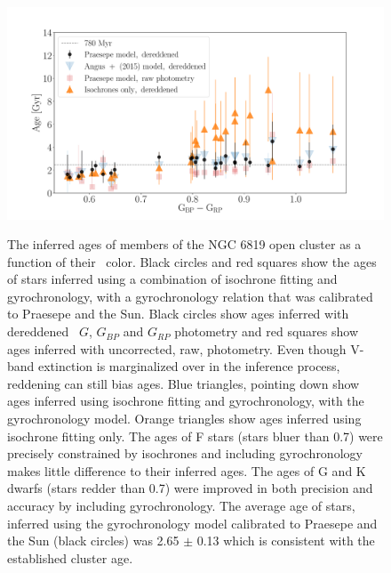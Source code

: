\begin{figure}
  \caption{
    The inferred ages of members of the NGC 6819 open cluster as a function of
    their \gcolor\ color.
    Black circles and red squares show the ages of stars inferred using a
    combination of isochrone fitting and gyrochronology, with a gyrochronology
    relation that was calibrated to Praesepe and the Sun.
    Black circles show ages inferred with dereddened \gaia\ $G$, $G_{BP}$ and
    $G_{RP}$ photometry and red squares show ages inferred with uncorrected,
    raw, photometry.
    Even though V-band extinction is marginalized over in the inference
    process, reddening can still bias ages.
    Blue triangles, pointing down show ages inferred using isochrone fitting
    and gyrochronology, with the \citet{angus2015} gyrochronology model.
    Orange triangles show ages inferred using isochrone fitting only.
    The ages of F stars (stars bluer than 0.7) were precisely constrained by
    isochrones and including gyrochronology makes little difference to their
    inferred ages.
    The ages of G and K dwarfs (stars redder than 0.7) were improved in both
    precision and accuracy by including gyrochronology.
    The average age of stars, inferred using the gyrochronology model
    calibrated to Praesepe and the Sun (black circles) was 2.65 $\pm$ 0.13
    which is consistent with the established cluster age.
}
  \centering
    \includegraphics[width=1\textwidth]{NGC6819_results}
\label{fig:NGC6819_results}
\end{figure}

